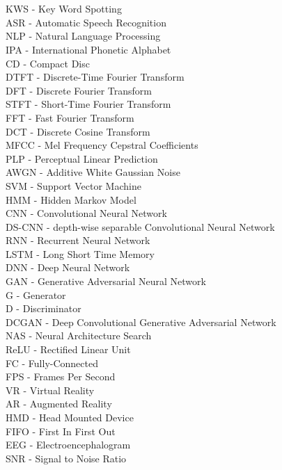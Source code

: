 
\chapter*{}
KWS - Key Word Spotting\\
ASR - Automatic Speech Recognition\\
NLP - Natural Language Processing\\
IPA - International Phonetic Alphabet\\
CD - Compact Disc\\
%
DTFT - Discrete-Time Fourier Transform\\
DFT - Discrete Fourier Transform\\
STFT - Short-Time Fourier Transform\\
FFT - Fast Fourier Transform\\
DCT - Discrete Cosine Transform\\
MFCC - Mel Frequency Cepstral Coefficients\\
PLP - Perceptual Linear Prediction\\
AWGN - Additive White Gaussian Noise\\
%
SVM - Support Vector Machine\\
HMM - Hidden Markov Model\\
%
CNN - Convolutional Neural Network\\
DS-CNN - depth-wise separable Convolutional Neural Network\\
RNN - Recurrent Neural Network\\
LSTM - Long Short Time Memory\\
DNN - Deep Neural Network\\
GAN - Generative Adversarial Neural Network\\
G - Generator\\
D - Discriminator\\
DCGAN - Deep Convolutional Generative Adversarial Network\\
NAS - Neural Architecture Search\\
ReLU - Rectified Linear Unit\\
FC - Fully-Connected\\
%
FPS - Frames Per Second\\
VR - Virtual Reality\\
AR - Augmented Reality\\
HMD - Head Mounted Device\\
%
FIFO - First In First Out\\
%
EEG - Electroencephalogram\\
SNR - Signal to Noise Ratio\\
